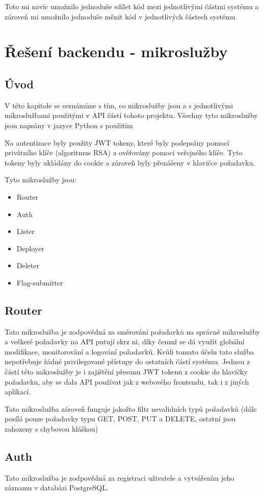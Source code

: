 \documentclass[12pt, a4paper,
oneside,      %
openright
]{report}
\begin{document}
Toto mi navíc umožnilo jednoduše sdílet kód mezi jednotlivými částmi systému a zároveň mi umožnilo jednoduše měnit kód v jednotlivých částech systému.


\chapter{Řešení backendu - mikroslužby}

\section{Úvod}
\label{sec:uvod}

V této kapitole se seznámíme s tím, co mikroslužby jsou a s jednotlivými mikroslužbami použitými v API částí tohoto projektu. Všechny tyto mikroslužby jsou napsány v jazyce Python s použitím 

Na autentizace byly použity JWT tokeny, které byly podepsány pomocí privátního klíče (algoritmus RSA) a ověřovány pomocí veřejného klíče. Tyto tokeny byly ukládány do cookie a zároveň byly přenášeny v hlavičce požadavku.

Tyto mikroslužby jsou:
\begin{itemize}
	\item Router
	\item Auth
	\item Lister
	\item Deployer 
	\item Deleter
	\item Flag-submitter
\end{itemize}

\section{Router}
Tato mikroslužba je zodpovědná za směrování požadavků na správné mikroslužby a veškeré požadavky na API putují skrz ni, díky čemuž se dá využít globální modifikace, monitorování a logování požadavků. Kvůli tomuto účelu tato služba nepotřebuje žádné privilegované přístupy do ostatních částí systému. Jednou z částí této mikroslužby je i zajištění přesunu JWT tokenu z cookie do hlavičky požadavku, aby se dala API používat jak z webového frontendu, tak i z jiných aplikací.

Tato mikroslužba zároveň funguje jakožto filtr nevalidních typů požadavků (dále posílá pouze požadavky typu GET, POST, PUT a DELETE, ostatní jsou zahozeny s chybovou hláškou)

\section{Auth}
Tato mikroslužba je zodpovědná za registraci uživatele a vytvářením jeho záznamu v databázi PostgreSQL. 
\end{document}
